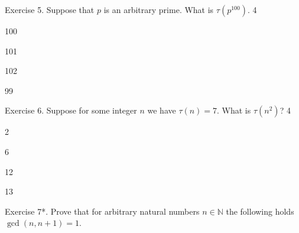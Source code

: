 \documentclass[../lecture-notes-148x210.tex]{subfiles}
\begin{document}
\vspace*{4mm}

\begin{xexercise}
    {Exercise 5.}
    {Suppose that $p$ is an arbitrary prime. What is $\tau(p^{100})$. }
    {4}
    {
        \item 100
        \item 101
        \item 102
        \item 99
    }    
\end{xexercise}

\begin{xexercise}
    {Exercise 6.}
    {Suppose for some integer $n$ we have $\tau(n)=7$. What is $\tau(n^2)$? \vspace*{-4mm}}
    {4}
    {
        \item 2
        \item 6
        \item 12
        \item 13
    }    
\end{xexercise}

\exerciseTitle
{Exercise 7*.}
{Prove that for arbitrary natural numbers $n \in \mathbb{N}$ the following holds $\gcd(n, n + 1) = 1$.}
\end{document}
